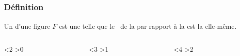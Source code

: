 \documentclass{beamer}
\begin{document}
\begin{frame}
\frametitle{Définition}  
\framesubtitle{}

Un \asym d'une figure $F$ est une   telle que le \sym\ de la  par rapport à la  est la  elle-même.

\begin{columns}[c]

\begin{column}{2.2cm}
\begin{exampleblock}<2->{0 \asyms}
\end{exampleblock}	
\end{column}

\begin{column}{2.2cm}
	\begin{exampleblock}<3->{1 \asym }
	\end{exampleblock}	
\end{column}

\begin{column}{2.2cm}
	\begin{exampleblock}<4->{2 \asyms}
	\end{exampleblock}	
\end{column}


\end{columns}
\end{frame}
\end{document}
